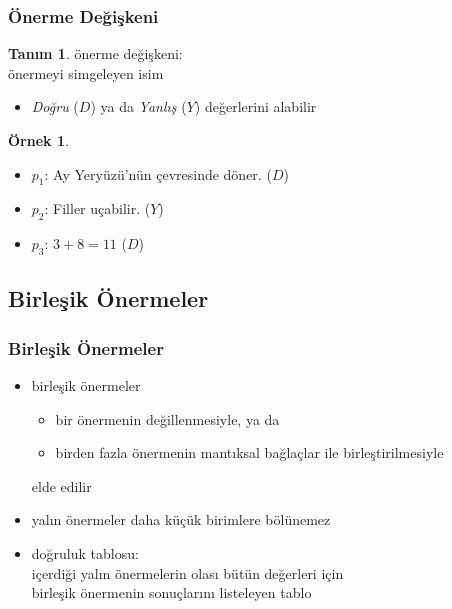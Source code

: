 \documentclass[dvipsnames]{beamer}
\theoremstyle{definition}
\newtheorem{tanim}[theorem]{Tanım}
\theoremstyle{example}
\newtheorem{ornek}[theorem]{Örnek}
\theoremstyle{plain}
\begin{document}
\begin{frame}
  \frametitle{Önerme Değişkeni}

  \begin{tanim}
    \alert{önerme değişkeni}:\\
      önermeyi simgeleyen isim

    \begin{itemize}
      \item \emph{Doğru} ($D$) ya da \emph{Yanlış} ($Y$) değerlerini alabilir
    \end{itemize}
  \end{tanim}

  \pause
  \begin{ornek}
    \begin{itemize}
      \item $p_1$: Ay Yeryüzü'nün çevresinde döner. ($D$)
      \item $p_2$: Filler uçabilir. ($Y$)
      \item $p_3$: $3+8=11$ ($D$)
    \end{itemize}
  \end{ornek}
\end{frame}

\subsection{Birleşik Önermeler}

\begin{frame}
  \frametitle{Birleşik Önermeler}

  \begin{itemize}
    \item{\alert{birleşik önermeler}
      \begin{itemize}
        \item bir önermenin değillenmesiyle, ya da
        \item birden fazla önermenin
          \alert{mantıksal bağlaçlar} ile birleştirilmesiyle
      \end{itemize}
      elde edilir}
    \item \alert{yalın önermeler} daha küçük birimlere bölünemez
  \end{itemize}

  \pause
  \begin{itemize}
    \item \alert{doğruluk tablosu}:\\
      içerdiği yalın önermelerin olası bütün değerleri için\\
      birleşik önermenin sonuçlarını listeleyen tablo
  \end{itemize}
\end{frame}
\end{document}
